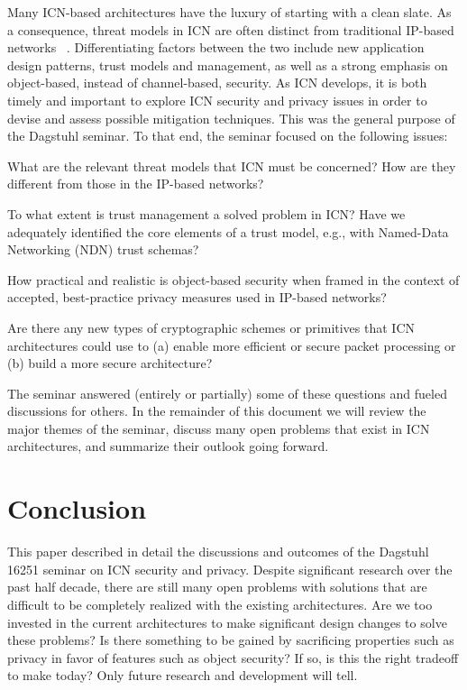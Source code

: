 \documentclass{sig-alternate-05-2015}
\makeatletter
\renewcommand{\paragraph}[1]{\vspace*{0.03in}\noindent{\bf #1.}\hspace{0.25ex \@plus1ex \@minus.2ex}}
\makeatother
\begin{document}
\paragraph{Current Research Challenges}
Many ICN-based architectures have the luxury of starting with a clean slate.
As a consequence, threat models in ICN are often distinct from traditional IP-based
networks ~\cite{wsv-bdpts-13,gtuz-ddndn-13}. Differentiating factors between the two include
new application design patterns, trust models and management, as well as a strong
emphasis on object-based, instead of channel-based, security. As ICN develops, it is both
timely and important to explore ICN security and privacy issues in order to devise and
assess possible mitigation techniques. This was the general purpose of the Dagstuhl
seminar. To that end, the seminar focused on the following issues:
%
\begin{compactitem}
\item What are the relevant threat models that ICN must be concerned? How are
they different from those in the IP-based networks?
\item To what extent is trust management a solved problem in ICN? Have we adequately
identified the core elements of a trust model, e.g., with Named-Data Networking (NDN) trust schemas?
\item How practical and realistic is object-based security when framed in the
context of accepted, best-practice privacy measures used in IP-based networks?
\item Are there any new types of cryptographic schemes or primitives that ICN architectures
could use to (a) enable more efficient or secure packet
processing or (b) build a more secure architecture?
\end{compactitem}
%
The seminar answered (entirely or partially) some of these questions and fueled discussions
for others. In the remainder of this document we will review the major themes of the
seminar, discuss many open problems that exist in ICN architectures, and summarize
their outlook going forward.




\section{Conclusion}
This paper described in detail the discussions and outcomes of the Dagstuhl 16251
seminar on ICN security and privacy. Despite significant research over the past
half decade, there are still many open problems with solutions that are difficult
to be completely realized with the existing architectures. Are we too invested in
the current architectures to make significant design changes to solve these problems?
Is there something to be gained by sacrificing properties such as privacy in favor
of features such as object security? If so, is this the right tradeoff to make today?
Only future research and development will tell.
\end{document}
